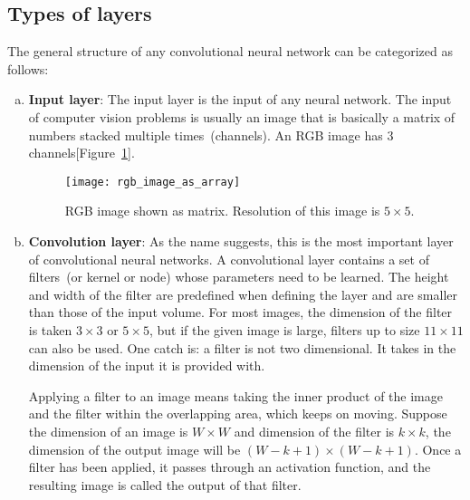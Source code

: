 \subsection{Types of layers}
\label{subsection:types_of_layers}
The general structure of any convolutional neural network can be categorized as follows:
\begin{enumerate}[(a)]
    \item \textbf{Input layer}:
        The input layer is the input of any neural network. The input of computer vision problems is usually an image that is basically a matrix of numbers stacked multiple times~(channels). An RGB image has 3 channels[Figure~\ref{fig:RGB_image}].
        \begin{figure}[h!]
            \centering
            \texttt{[image: rgb\_image\_as\_array]}
            \caption[RGB image shown as matrix]{RGB image shown as matrix. Resolution of this image is $5\times5$.}
            \label{fig:RGB_image}
        \end{figure}
        
    \item \textbf{Convolution layer}:
        As the name suggests, this is the most important layer of convolutional neural networks. A convolutional layer contains a set of filters~(or kernel or node) whose parameters need to be learned. The height and width of the filter are predefined when defining the layer and are smaller than those of the input volume. For most images, the dimension of the filter is taken $3\times3$ or $5\times5$, but if the given image is large, filters up to size $11\times11$ can also be used. One catch is: a filter is not two dimensional. It takes in the dimension of the input it is provided with.

        Applying a filter to an image means taking the inner product of the image and the filter within the overlapping area, which keeps on moving. Suppose the dimension of an image is $W\times W$ and dimension of the filter is $k\times k$, the dimension of the output image will be $(W-k+1)\times (W-k+1)$. Once a filter has been applied, it passes through an activation function, and the resulting image is called the output of that filter.
    

\end{enumerate}
